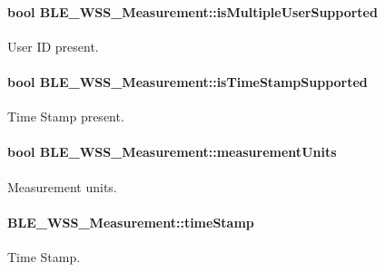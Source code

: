 \paragraph[{\texorpdfstring{is\+Multiple\+User\+Supported}{isMultipleUserSupported}}]{\setlength{\rightskip}{0pt plus 5cm}bool B\+L\+E\+\_\+\+W\+S\+S\+\_\+\+Measurement\+::is\+Multiple\+User\+Supported}\hypertarget{struct_b_l_e___w_s_s___measurement_af3c179bfde9600ad12d29f6d8d8eeaad}{}\label{struct_b_l_e___w_s_s___measurement_af3c179bfde9600ad12d29f6d8d8eeaad}
User ID present. 
\paragraph[{\texorpdfstring{is\+Time\+Stamp\+Supported}{isTimeStampSupported}}]{\setlength{\rightskip}{0pt plus 5cm}bool B\+L\+E\+\_\+\+W\+S\+S\+\_\+\+Measurement\+::is\+Time\+Stamp\+Supported}\hypertarget{struct_b_l_e___w_s_s___measurement_a623ec6e009deb26bece7a1714e798b12}{}\label{struct_b_l_e___w_s_s___measurement_a623ec6e009deb26bece7a1714e798b12}
Time Stamp present. 
\paragraph[{\texorpdfstring{measurement\+Units}{measurementUnits}}]{\setlength{\rightskip}{0pt plus 5cm}bool B\+L\+E\+\_\+\+W\+S\+S\+\_\+\+Measurement\+::measurement\+Units}\hypertarget{struct_b_l_e___w_s_s___measurement_a76a6d2a1e7261ce9365656c0dc32a144}{}\label{struct_b_l_e___w_s_s___measurement_a76a6d2a1e7261ce9365656c0dc32a144}
Measurement units. 
\paragraph[{\texorpdfstring{time\+Stamp}{timeStamp}}]{ B\+L\+E\+\_\+\+W\+S\+S\+\_\+\+Measurement\+::time\+Stamp}\hypertarget{struct_b_l_e___w_s_s___measurement_a8eeabf937e8e6136c48895cb4c2fa774}{}\label{struct_b_l_e___w_s_s___measurement_a8eeabf937e8e6136c48895cb4c2fa774}
Time Stamp. 
